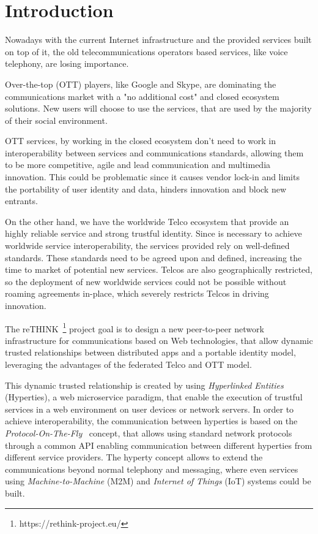 \chapter{Introduction}
\label{chapter:introduction}
Nowadays with the current Internet infrastructure and the provided services built on top of it, the old telecommunications operators based services, like voice telephony, are losing importance.

Over-the-top (OTT) players, like Google and Skype, are dominating the communications market with a "no additional cost" and closed ecosystem solutions.
New users will choose to use the services, that are used by the majority of their social environment.

OTT services, by working in the closed ecosystem don't need to work in interoperability between services and communications standards, allowing them to be more competitive, agile and lead communication and multimedia innovation.
This could be problematic since it causes vendor lock-in and limits the portability of user identity and data, hinders innovation and block new entrants.

On the other hand, we have the worldwide Telco ecosystem that provide an highly reliable service and strong trustful identity.
Since is necessary to achieve worldwide service interoperability, the services provided rely on well-defined standards. These standards need to be agreed upon and defined, increasing the time to market of potential new services.
Telcos are also geographically restricted, so the deployment of new worldwide services could not be possible without roaming agreements in-place, which severely restricts Telcos in driving innovation.

The reTHINK~\footnote{https://rethink-project.eu/} project goal is to design a new peer-to-peer network infrastructure for communications based on Web technologies, that allow dynamic trusted relationships between distributed apps and a portable identity model, leveraging the advantages of the federated Telco and OTT model.

This dynamic trusted relationship is created by using \textit{Hyperlinked Entities} (Hyperties), a web microservice paradigm, that enable the execution of trustful services in a web environment on user devices or network servers.
In order to achieve interoperability, the communication between hyperties is based on the \textit{Protocol-On-The-Fly}~\cite{protofly} concept, that allows using standard network protocols through a common API enabling communication between different hyperties from different service providers.
The hyperty concept allows to extend the communications beyond normal telephony and messaging, where even services using \textit{Machine-to-Machine} (M2M) and \textit{Internet of Things} (IoT) systems could be built.


